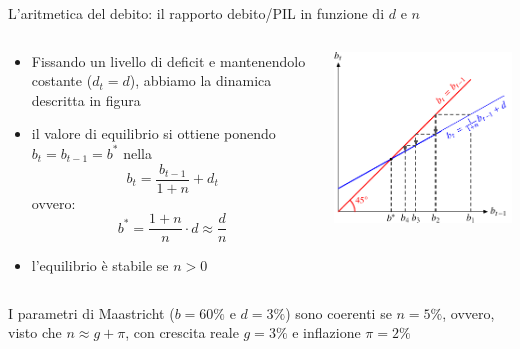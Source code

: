 \documentclass[aspectratio=149,11pt,italian]{beamer}
\begin{document}
\begin{frame}{L'aritmetica del debito: il rapporto debito/PIL in funzione di $d$ e $n$}
\begin{columns}
\begin{column}{.5\columnwidth}
\begin{itemize}
\item Fissando un livello di deficit e mantenendolo costante ($d_{t}=d$), abbiamo
la dinamica descritta in figura
\item il valore di equilibrio si ottiene ponendo $b_{t}=b_{t-1}=b^*$ nella
\begin{equation*}
  b_{t}=\frac{b_{t-1}}{1+n}+d_{t}
\end{equation*}
ovvero:
\begin{equation*}
  b^*=\frac{1+n}{n}\cdot d \approx \frac{d}{n}
\end{equation*}
\item l'equilibrio è stabile se $n>0$
\end{itemize}
\end{column}

\begin{column}{.5\columnwidth}
\begin{center}
\centering
\includegraphics[width=\textwidth]{./figure/debito-pubblico-sost-1.pdf}
\end{center}
\end{column}
\end{columns}
\begin{block}{}
I parametri di Maastricht ($b=60\%$ e $d=3\%$) sono coerenti se $n=5\%$,
ovvero, visto che $n\approx g + \pi$, con crescita reale $g=3\%$ e inflazione
$\pi=2\%$
\end{block}
\end{frame}
\end{document}
